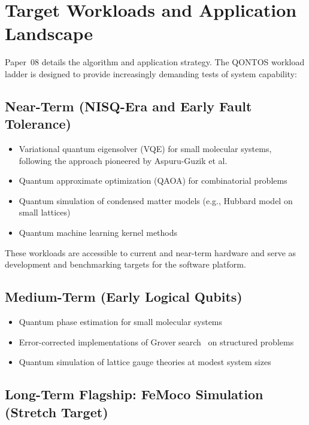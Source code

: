 \documentclass[conference]{IEEEtran}
\begin{document}
\section{Target Workloads and Application Landscape}

Paper~08 details the algorithm and application strategy. The QONTOS workload ladder is designed to provide increasingly demanding tests of system capability:

\subsection{Near-Term (NISQ-Era and Early Fault Tolerance)}

\begin{itemize}
\item Variational quantum eigensolver (VQE) for small molecular systems, following the approach pioneered by Aspuru-Guzik et al.~\cite{aspuruguzik2005}
\item Quantum approximate optimization (QAOA) for combinatorial problems
\item Quantum simulation of condensed matter models (e.g., Hubbard model on small lattices)
\item Quantum machine learning kernel methods
\end{itemize}

These workloads are accessible to current and near-term hardware and serve as development and benchmarking targets for the software platform.

\subsection{Medium-Term (Early Logical Qubits)}

\begin{itemize}
\item Quantum phase estimation for small molecular systems
\item Error-corrected implementations of Grover search~\cite{grover1996} on structured problems
\item Quantum simulation of lattice gauge theories at modest system sizes
\end{itemize}

\subsection{Long-Term Flagship: FeMoco Simulation (Stretch Target)}
\end{document}
